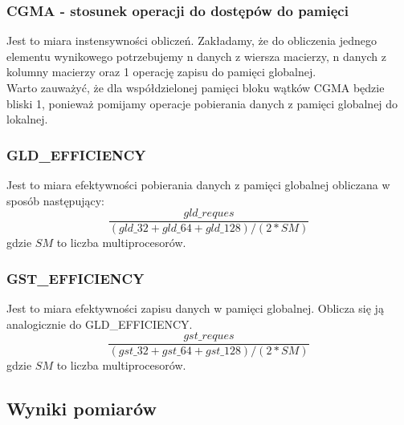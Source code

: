 \documentclass[10pt,a4paper]{article}
\begin{document}
\subsubsection*{CGMA - stosunek operacji do dostępów do pamięci}
Jest to miara instensywności obliczeń. Zakładamy, że do obliczenia jednego elementu
wynikowego potrzebujemy n danych z wiersza macierzy, n danych z kolumny macierzy
oraz 1 operację zapisu do pamięci globalnej.\\
Warto zauważyć, że dla współdzielonej pamięci bloku wątków CGMA będzie bliski 1,
ponieważ pomijamy operacje pobierania danych z pamięci globalnej do lokalnej.


\subsubsection*{GLD\_EFFICIENCY}
Jest to miara efektywności pobierania danych z pamięci globalnej obliczana w sposób
następujący:
\begin{equation}
	\frac{gld\_reques}{(gld\_32 + gld\_64 + gld\_128) / (2*SM)}
\end{equation}
gdzie $SM$ to liczba multiprocesorów.

\subsubsection*{GST\_EFFICIENCY}
Jest to miara efektywności zapisu danych w pamięci globalnej.
Oblicza się ją analogicznie do GLD\_EFFICIENCY.
\begin{equation}
	\frac{gst\_reques}{(gst\_32 + gst\_64 + gst\_128) / (2*SM)}
\end{equation}
gdzie $SM$ to liczba multiprocesorów.

\subsection{Wyniki pomiarów}

\begin{table}
											
											
\end{table}
\end{document}
